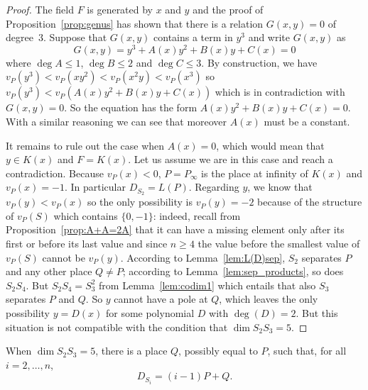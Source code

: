 \documentclass[ALCO,Unicode,ThmDefs]{cedram}
\renewcommand{\geq}{\geqslant}
\renewcommand{\leq}{\leqslant}
\begin{document}
\begin{proof}
The field $F$ is generated by $x$ and $y$ and the proof of Proposition~\ref{prop:genus} has shown that there is a relation $G(x,y)=0$ of degree~$3$. Suppose that $G(x,y)$ contains a term in $y^3$ and write $G(x,y)$ as
\begin{equation*}
G(x, y)= y^3 + A(x)y^2 + B(x)y + C(x)=0
\end{equation*}
where $\deg A\leq1$, $\deg B\leq2$ and $\deg C\leq3$. By construction, we have $v_P(y^3)<v_P(xy^2)<v_P(x^2y)<v_P(x^3)$ so $v_P(y^3)<v_P(A(x)y^2+B(x)y+C(x))$ which is in contradiction with $G(x,y)=0$. So the equation has the form $A(x)y^2 + B(x)y + C(x)=0$. With a similar reasoning we can see that moreover $A(x)$ must be a constant.

It remains to rule out the case when $A(x)=0$, which would mean that $y\in K(x)$ and $F=K(x)$. Let us assume we are in this case and reach a contradiction. Because $v_P(x)<0$, $P=P_\infty$ is the place at infinity of $K(x)$ and $v_P(x)=-1$. In particular $D_{S_2}=L(P)$. Regarding $y$, we know that $v_P(y)<v_P(x)$ so the only possibility is $v_P(y)=-2$ because of the structure of $v_P(S)$ which contains $\{0,-1\}$: indeed, recall from Proposition~\ref{prop:A+A=2A} that it can have a missing element only after its first or before its last value and since $n\geq4$ the value before the smallest value of $v_P(S)$ cannot be $v_P(y)$. According to Lemma~\ref{lem:L(D)sep}, $S_2$ separates $P$ and any other place $Q\neq P$; according to Lemma~\ref{lem:sep_products}, so does $S_2S_4$. But $S_2S_4=S_3^2$ from Lemma~\ref{lem:codim1} which entails that also $S_3$ separates $P$ and $Q$. So $y$ cannot have a pole at $Q$, which leaves the only possibility $y=D(x)$ {for some polynomial $D$ with} $\deg(D)=2$. But this situation is not compatible with the condition that $\dim S_2S_3=5$.
\end{proof}

\begin{prop}
When $\dim S_2S_3=5$, there is a place $Q$, possibly equal to $P$, such that, for all $i=2,\ldots,n$,
\[
D_{S_i}=(i-1)P+Q.
\]
\end{prop}
\end{document}
